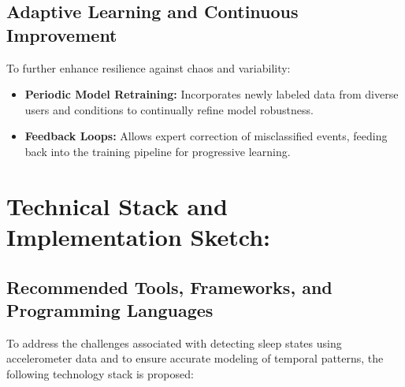 \documentclass[conference]{IEEEtran}
\begin{document}
\subsection{Adaptive Learning and Continuous Improvement}

To further enhance resilience against chaos and variability:
\begin{itemize}
\item \textbf{Periodic Model Retraining:} Incorporates newly labeled data from diverse users and conditions to continually refine model robustness.
\item \textbf{Feedback Loops:} Allows expert correction of misclassified events, feeding back into the training pipeline for progressive learning.
\end{itemize}

\section{Technical Stack and Implementation Sketch:}

\subsection{Recommended Tools, Frameworks, and Programming Languages}

To address the challenges associated with detecting sleep states using accelerometer data and to ensure accurate modeling of temporal patterns, the following technology stack is proposed:
\end{document}
